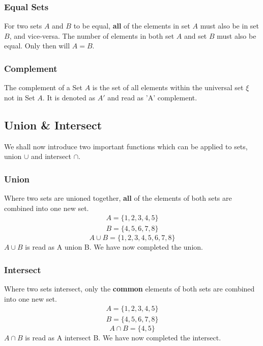 \documentclass{report}
\begin{document}
\begin{flushleft}
\subsubsection{Equal Sets}
For two sets $A$ and $B$ to be equal, \textbf{all} of the elements in set $A$ must also be in set $B$, and vice-versa. The number of elements in both set $A$ and set $B$ must also be equal. Only then will $A=B$.

\subsubsection{Complement}
The complement of a Set $A$ is the set of all elements within the universal set $\xi$ not in Set $A$. It is denoted as $A'$ and read as 'A' complement.

\subsection{Union \& Intersect}
We shall now introduce two important functions which can be applied to sets, union $\cup$ and intersect $\cap$.

\subsubsection{Union}
Where two sets are unioned together, \textbf{all} of the elements of both sets are combined into one new set.
\begin{gather*}
    A=\{1,2,3,4,5\}\\
    B=\{4,5,6,7,8\}
\end{gather*}
\begin{equation}
    A\cup B = \{1,2,3,4,5,6,7,8\}
\end{equation}
$A\cup B$ is read as A union B. We have now completed the union.

\subsubsection{Intersect}
Where two sets intersect, only the \textbf{common} elements of both sets are combined into one new set.
\begin{gather*}
    A=\{1,2,3,4,5\}\\
    B=\{4,5,6,7,8\}
\end{gather*}
\begin{equation}
    A\cap B = \{4,5\}
\end{equation}
$A\cap B$ is read as A intersect B. We have now completed the intersect.


\end{flushleft}
\end{document}
